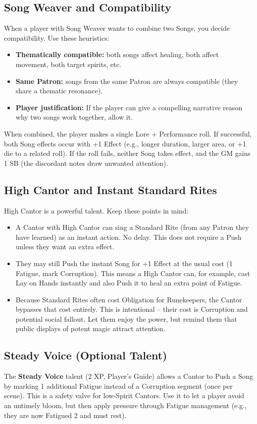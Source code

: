 \subsection*{Song Weaver and Compatibility}
\label{subsec:song-weaver-gm}
When a player with Song Weaver wants to combine two Songs, you decide compatibility. Use these heuristics:
\begin{itemize}
  \item \textbf{Thematically compatible:} both songs affect healing, both affect movement, both target spirits, etc.
  \item \textbf{Same Patron:} songs from the same Patron are always compatible (they share a thematic resonance).
  \item \textbf{Player justification:} If the player can give a compelling narrative reason why two songs work together, allow it.
\end{itemize}
When combined, the player makes a single Lore + Performance roll. If successful, both Song effects occur with +1 Effect (e.g., longer duration, larger area, or +1 die to a related roll). If the roll fails, neither Song takes effect, and the GM gains 1 SB (the discordant notes draw unwanted attention).

\subsection*{High Cantor and Instant Standard Rites}
\label{subsec:high-cantor-gm}
High Cantor is a powerful talent. Keep these points in mind:
\begin{itemize}
  \item A Cantor with High Cantor can sing a Standard Rite (from any Patron they have learned) as an instant action. No delay. This does not require a Push unless they want an extra effect.
  \item They may still Push the instant Song for +1 Effect at the usual cost (1 Fatigue, mark Corruption). This means a High Cantor can, for example, cast Lay on Hands instantly and also Push it to heal an extra point of Fatigue.
  \item Because Standard Rites often cost Obligation for Runekeepers, the Cantor bypasses that cost entirely. This is intentional -- their cost is Corruption and potential social fallout. Let them enjoy the power, but remind them that public displays of potent magic attract attention.
\end{itemize}

\subsection*{Steady Voice (Optional Talent)}
\label{subsec:steady-voice-gm}
The \textbf{Steady Voice} talent (2 XP, Player's Guide) allows a Cantor to Push a Song by marking 1 additional Fatigue instead of a Corruption segment (once per scene). This is a safety valve for low-Spirit Cantors. Use it to let a player avoid an untimely bloom, but then apply pressure through Fatigue management (e.g., they are now Fatigued 2 and must rest).

